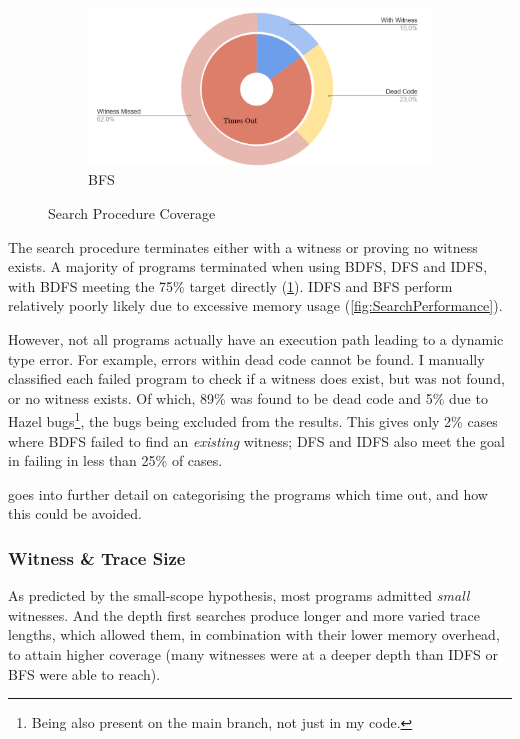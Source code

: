 \begin{figure}[h]
\begin{subfigure}{0.45\textwidth}
\includegraphics[width=\textwidth]{Media/Figures/BFS_coverage}
\caption{BFS}
\end{subfigure}

\caption{Search Procedure Coverage}
\label{fig:PieChart}
\end{figure}

The search procedure terminates either with a witness or proving no witness exists. A majority of programs terminated when using BDFS, DFS and IDFS, with BDFS meeting the 75\% target directly (\cref{fig:PieChart}). IDFS and BFS perform relatively poorly likely due to excessive memory usage (\cref{fig:SearchPerformance}). 

However, not all programs actually have an execution path leading to a dynamic type error. For example, errors within dead code cannot be found. I manually classified each failed program to check if a witness does exist, but was not found, or no witness exists. Of which, 89\% was found to be dead code and 5\% due to Hazel bugs\footnote{Being also present on the main branch, not just in my code.}, the bugs being excluded from the results. This gives only 2\% cases where BDFS failed to find an \textit{existing} witness; DFS and IDFS also meet the goal in failing in less than 25\% of cases.

 goes into further detail on categorising the programs which time out, and how this could be avoided.

\subsubsection{Witness \& Trace Size}
As predicted by the small-scope hypothesis, most programs admitted \textit{small} witnesses. And the depth first searches produce longer and more varied trace lengths, which allowed them, in combination with their lower memory overhead, to attain higher coverage (many witnesses were at a deeper depth than IDFS or BFS were able to reach).

